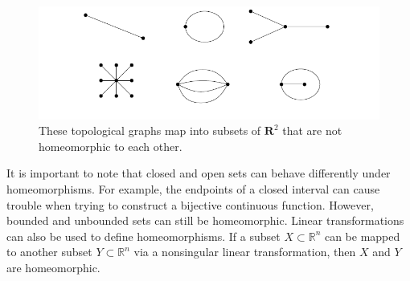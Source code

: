 \documentclass[12]{article}
\begin{document}
\begin{figure}[h]
\centering
\includegraphics[scale=0.5]{images/homeomorphic_graphs_2.png}
\caption{These topological graphs map into subsets of $\mathbf{R}^2$ that are not homeomorphic to each other.}
\label{fig:homeomorphic_graphs_2}
\end{figure}

It is important to note that closed and open sets can behave differently under homeomorphisms. For example, the endpoints of a closed interval can cause trouble when trying to construct a bijective continuous function. However, bounded and unbounded sets can still be homeomorphic. Linear transformations can also be used to define homeomorphisms. If a subset $X \subset \mathbb{R}^n$ can be mapped to another subset $Y \subset \mathbb{R}^n$ via a nonsingular linear transformation, then $X$ and $Y$ are homeomorphic.
\end{document}

